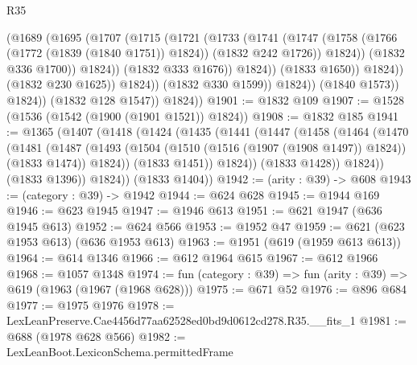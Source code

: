 \begin{lexlean}{R35}
\begin{coremodule}
                                  (@1689
                                    (@1695
                                      (@1707
                                        (@1715
                                          (@1721
                                            (@1733
                                              (@1741
                                                (@1747
                                                  (@1758
                                                    (@1766 (@1772 (@1839 (@1840 @1751)) @1824))
                                                    (@1832 @242 @1726))
                                                  @1824))
                                              (@1832 @336 @1700))
                                            @1824))
                                        (@1832 @333 @1676))
                                      @1824))
                                  (@1833 @1650))
                                @1824))
                            (@1832 @230 @1625))
                          @1824))
                      (@1832 @330 @1599))
                    @1824))
                (@1840 @1573))
              @1824))
          (@1832 @128 @1547))
        @1824))
@1901 := @1832 @109
@1907 := @1528 (@1536 (@1542 (@1900 (@1901 @1521)) @1824))
@1908 := @1832 @185
@1941 := @1365
    (@1407
      (@1418
        (@1424
          (@1435
            (@1441
              (@1447
                (@1458
                  (@1464
                    (@1470
                      (@1481
                        (@1487
                          (@1493
                            (@1504 (@1510 (@1516 (@1907 (@1908 @1497)) @1824)) (@1833 @1474))
                            @1824))
                        (@1833 @1451))
                      @1824))
                  (@1833 @1428))
                @1824))
            (@1833 @1396))
          @1824))
      (@1833 @1404))
@1942 := (arity : @39) -> @608
@1943 := (category : @39) -> @1942
@1944 := @624 @628
@1945 := @1944 @169
@1946 := @623 @1945
@1947 := @1946 @613
@1951 := @621 @1947 (@636 @1945 @613)
@1952 := @624 @566
@1953 := @1952 @47
@1959 := @621 (@623 @1953 @613) (@636 @1953 @613)
@1963 := @1951 (@619 (@1959 @613 @613))
@1964 := @614 @1346
@1966 := @612 @1964 @615
@1967 := @612 @1966
@1968 := @1057 @1348
@1974 := fun (category : @39) => fun (arity : @39) => @619 (@1963 (@1967 (@1968 @628)))
@1975 := @671 @52
@1976 := @896 @684
@1977 := @1975 @1976
@1978 := LexLeanPreserve.Cae4456d77aa62528ed0bd9d0612cd278.R35.__fits_1
@1981 := @688 (@1978 @628 @566)
@1982 := LexLeanBoot.LexiconSchema.permittedFrame

\end{coremodule}
\end{lexlean}
